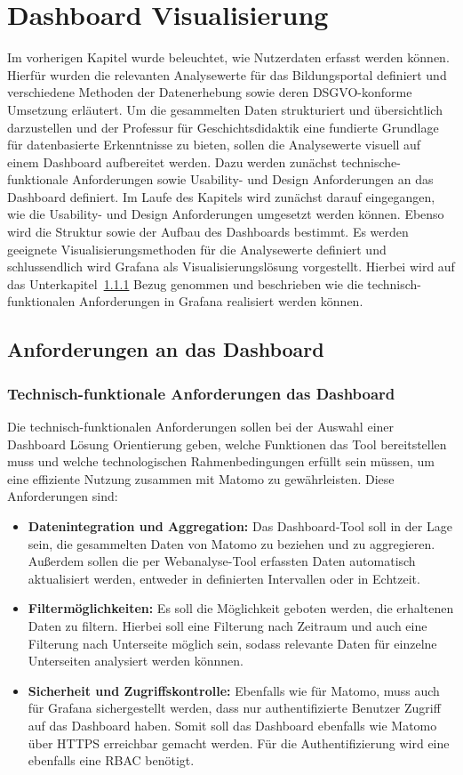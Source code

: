 \chapter{Dashboard Visualisierung} %
\label{ch:auswahl}
Im vorherigen Kapitel wurde beleuchtet, wie Nutzerdaten erfasst werden können. Hierfür wurden die relevanten Analysewerte für das Bildungsportal definiert und verschiedene Methoden der Datenerhebung sowie deren DSGVO-konforme Umsetzung erläutert. Um die gesammelten Daten strukturiert und übersichtlich darzustellen und der Professur für Geschichtsdidaktik eine fundierte Grundlage für datenbasierte Erkenntnisse zu bieten, sollen die Analysewerte visuell auf einem Dashboard aufbereitet werden. Dazu werden zunächst technische-funktionale Anforderungen sowie Usability- und Design Anforderungen an das Dashboard definiert. Im Laufe des Kapitels wird zunächst darauf eingegangen, wie die Usability- und Design Anforderungen umgesetzt werden können. Ebenso wird die Struktur sowie der Aufbau des Dashboards bestimmt. Es werden geeignete Visualisierungsmethoden für die Analysewerte definiert und schlussendlich wird Grafana als Visualisierungslösung vorgestellt. Hierbei wird auf das Unterkapitel~\ref{sssec:technfunk} Bezug genommen und beschrieben wie die technisch-funktionalen Anforderungen in Grafana realisiert werden können.

\section{Anforderungen an das Dashboard}
\label{sec:anforderungen}
\subsection{Technisch-funktionale Anforderungen das Dashboard}
\label{sssec:technfunk}
Die technisch-funktionalen Anforderungen sollen bei der Auswahl einer Dashboard Lösung Orientierung geben, welche Funktionen das Tool bereitstellen muss und welche technologischen Rahmenbedingungen erfüllt sein müssen, um eine effiziente Nutzung zusammen mit Matomo zu gewährleisten. Diese Anforderungen sind: 
\begin{itemize}
    \item \textbf{Datenintegration und Aggregation:} Das Dashboard-Tool soll in der Lage sein, die gesammelten Daten von Matomo zu beziehen und zu aggregieren. Außerdem sollen die per Webanalyse-Tool erfassten Daten automatisch aktualisiert werden, entweder in definierten Intervallen oder in Echtzeit.
    \item \textbf{Filtermöglichkeiten:} Es soll die Möglichkeit geboten werden, die erhaltenen Daten zu filtern. Hierbei soll eine Filterung nach Zeitraum und auch eine Filterung nach Unterseite möglich sein, sodass relevante Daten für einzelne Unterseiten analysiert werden könnnen. 
    \item \textbf{Sicherheit und Zugriffskontrolle:} Ebenfalls wie für Matomo, muss auch für Grafana sichergestellt werden, dass nur authentifizierte Benutzer Zugriff auf das Dashboard haben. Somit soll das Dashboard ebenfalls wie Matomo über HTTPS erreichbar gemacht werden. Für die Authentifizierung wird eine ebenfalls eine RBAC benötigt.
\end{itemize}

